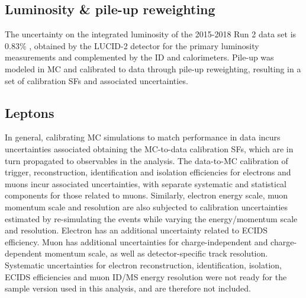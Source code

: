 \documentclass[../thesis.tex]{subfiles}
\begin{document}

\subsection{Luminosity \& pile-up reweighting}
The uncertainty on the integrated luminosity of the 2015-2018 Run 2 data set is $0.83\%$ \citep{DAPR-2021-01}, obtained by the LUCID-2 detector \citep{LUCID2} for the primary luminosity measurements and complemented by the \acs{ID} and calorimeters. Pile-up was modeled in \acs{MC} and calibrated to data through pile-up reweighting, resulting in a set of calibration \acs{SF}s and associated uncertainties.

\subsection{Leptons}
In general, calibrating \acs{MC} simulations to match performance in data incurs uncertainties associated obtaining the MC-to-data calibration \acs{SF}s, which are in turn propagated to observables in the analysis. The data-to-\acs{MC} calibration of trigger, reconstruction, identification and isolation efficiencies for electrons and muons incur associated uncertainties, with separate systematic and statistical components for those related to muons. Similarly, electron energy scale, muon momentum scale and resolution are also subjected to calibration uncertainties estimated by re-simulating the events while varying the energy/momentum scale and resolution. Electron has an additional uncertainty related to \acs{ECIDS} efficiency. Muon has additional uncertainties for charge-independent and charge-dependent momentum scale, as well as detector-specific track resolution. Systematic uncertainties for electron reconstruction, identification, isolation, \acs{ECIDS} efficiencies and muon \acs{ID}/\acs{MS} energy resolution were not ready for the sample version used in this analysis, and are therefore not included.
\end{document}
